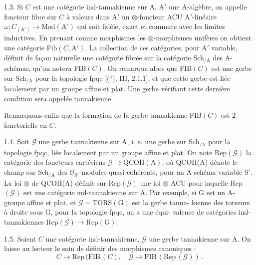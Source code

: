 
1.3. Si $C$ est une catégorie ind-tannakienne sur A, A$'$ une A-algèbre,
on appelle foncteur fibre sur $C$ à valeurs dans A$'$ un $\otimes$-foncteur ACU
A$'$-linéaire $\omega : C_{(\mathrm{A}')} \to \mathrm{Mod}(\mathrm{A}')$ qui soit fidèle, exact et commute avec les
limites inductives. En prenant comme morphismes les $\otimes$-morphismes
unifères on obtient une catégorie Fib$(C, \mathrm{A}')$. La collection de ces catégories,
pour A$'$ variable, définit de façon naturelle une catégorie fibrée sur la
catégorie Sch$_{/\mathrm{A}}$ des A-schémas, qu'on notera FIB$(C)$. On remarque alors
que FIB$(C)$ est une gerbe sur Sch$_{/\mathrm{A}}$ pour la topologie fpqc [(${}^{4}$), III, 2.1.1],
et que cette gerbe est liée localement par un groupe affine et plat. Une
gerbe vérifiant cette dernière condition sera appelée tannakienne.

Remarquons enfin que la formation de la gerbe tannakienne FIB$(C)$
est 2-fonctorielle en $C$.

1.4. Soit $\mathcal{G}$ une gerbe tannakienne sur A, i. e. une gerbe sur Sch$_{/\mathrm{A}}$
pour la topologie fpqc, liée localement par un groupe affine et plat. On note
Rep$(\mathcal{G})$ la catégorie des foncteurs cartésiens $\mathcal{G} \to \mathrm{QCOH}(\mathrm{A})$, où QCOH(A)
dénote le champ sur Sch$_{/\mathrm{A}}$ des $\mathcal{O}_{\mathrm{S}'}$-modules quasi-cohérents, pour un A-schéma
variable S$'$. La loi $\otimes$ de QCOH(A) définit sur Rep$(\mathcal{G})$ une loi $\otimes$ ACU pour
laquelle Rep$(\mathcal{G})$ est une catégorie ind-tannakienne sur A. Par exemple,
si G est un A-groupe affine et plat, et $\mathcal{G} = \mathrm{TORS}(\mathrm{G})$ est la gerbe tanna-%
kienne des torseurs à droite sous G, pour la topologie fpqc, on a une équi-%
valence de catégories ind-tannakiennes Rep$(\mathcal{G}) \to \mathrm{Rep}(\mathrm{G})$.

1.5. Soient $C$ une catégorie ind-tannakienne, $\mathcal{G}$ une gerbe tannakienne
sur A. On laisse au lecteur le soin de définir des morphismes canoniques :
\[ C \to \mathrm{Rep}\,(\mathrm{FIB}\,(C), \quad \mathcal{G} \to \mathrm{FIB}\,(\mathrm{Rep}\,(\mathcal{G}))\,. \]

